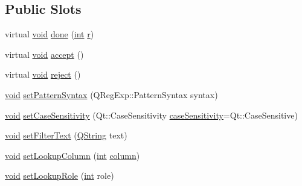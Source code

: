 \subsection*{Public Slots}
\begin{DoxyCompactItemize}
\item 
virtual \hyperlink{group___u_a_v_objects_plugin_ga444cf2ff3f0ecbe028adce838d373f5c}{void} \hyperlink{class_qxt_filter_dialog_a489b6e0a8c33b1b12679ec60788c4d45}{done} (\hyperlink{ioapi_8h_a787fa3cf048117ba7123753c1e74fcd6}{int} \hyperlink{glext_8h_abe08814c2f72843fde4d8df41440d5a0}{r})
\item 
virtual \hyperlink{group___u_a_v_objects_plugin_ga444cf2ff3f0ecbe028adce838d373f5c}{void} \hyperlink{class_qxt_filter_dialog_a16f1e29f2bda69fa471234698b6fe705}{accept} ()
\item 
virtual \hyperlink{group___u_a_v_objects_plugin_ga444cf2ff3f0ecbe028adce838d373f5c}{void} \hyperlink{class_qxt_filter_dialog_a94b6fa299122b2b225ecac7064f55597}{reject} ()
\item 
\hyperlink{group___u_a_v_objects_plugin_ga444cf2ff3f0ecbe028adce838d373f5c}{void} \hyperlink{class_qxt_filter_dialog_aa77f58e963f330c3d5f092a44ff06e3e}{set\-Pattern\-Syntax} (Q\-Reg\-Exp\-::\-Pattern\-Syntax syntax)
\item 
\hyperlink{group___u_a_v_objects_plugin_ga444cf2ff3f0ecbe028adce838d373f5c}{void} \hyperlink{class_qxt_filter_dialog_ae259e45e665d0a4471b631e8a83e0eba}{set\-Case\-Sensitivity} (Qt\-::\-Case\-Sensitivity \hyperlink{qxtstringvalidator_8h_af7fb4792796acf247594ddee41c93a3e}{case\-Sensitivity}=Qt\-::\-Case\-Sensitive)
\item 
\hyperlink{group___u_a_v_objects_plugin_ga444cf2ff3f0ecbe028adce838d373f5c}{void} \hyperlink{class_qxt_filter_dialog_a6281d82987ac4b8e6a33556fc567d341}{set\-Filter\-Text} (\hyperlink{group___u_a_v_objects_plugin_gab9d252f49c333c94a72f97ce3105a32d}{Q\-String} text)
\item 
\hyperlink{group___u_a_v_objects_plugin_ga444cf2ff3f0ecbe028adce838d373f5c}{void} \hyperlink{class_qxt_filter_dialog_a97f7003e37dae675ee2d038ec6fd943f}{set\-Lookup\-Column} (\hyperlink{ioapi_8h_a787fa3cf048117ba7123753c1e74fcd6}{int} \hyperlink{glext_8h_a3b58c39b1b7ca6f4012b27e84de3bdb3}{column})
\item 
\hyperlink{group___u_a_v_objects_plugin_ga444cf2ff3f0ecbe028adce838d373f5c}{void} \hyperlink{class_qxt_filter_dialog_a9eb89c02986483226f6d314f92d49c75}{set\-Lookup\-Role} (\hyperlink{ioapi_8h_a787fa3cf048117ba7123753c1e74fcd6}{int} role)
\end{DoxyCompactItemize}
